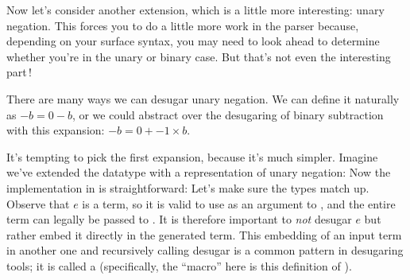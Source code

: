 
Now let’s consider another extension, which is a little more interesting: unary
negation. This forces you to do a little more work in the parser because,
depending on your surface syntax, you may need to look ahead to determine
whether you’re in the unary or binary case. But that’s not even the interesting
part\,!

There are many ways we can desugar unary negation. We can define it naturally as
$-b=0-b$, or we could abstract over the desugaring of binary
subtraction with this expansion: $-b=0+ -1 \times b$.


It’s tempting to pick the first expansion, because it’s much simpler. Imagine
we’ve extended the  datatype with a representation of unary
negation:
Now the implementation in  is straightforward:
Let’s make sure the types match up. Observe that $e$ is a  term,
so it is valid to use as an argument to , and the entire term can
legally be passed to .
It is therefore important to \emph{not} desugar $e$ but rather embed it directly
in the generated term. This embedding of an input term in another one and
recursively calling desugar is a common pattern in desugaring tools; it is
called a  (specifically, the ``macro'' here is this
definition of ).

